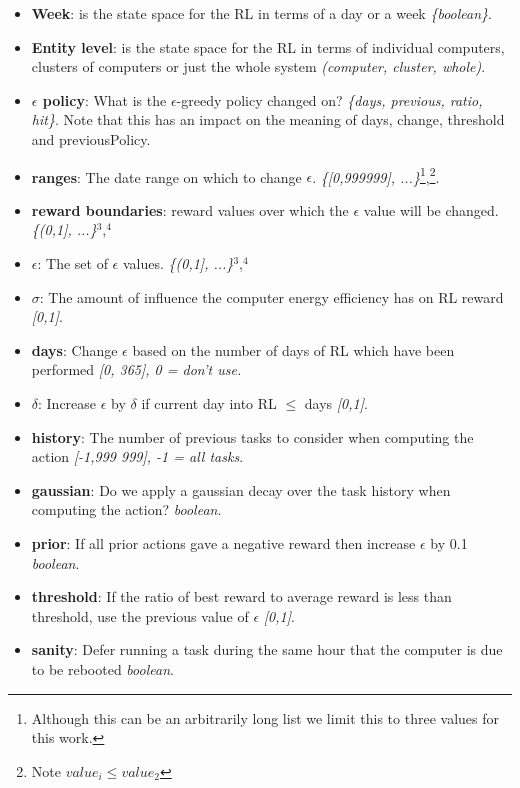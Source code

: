 \documentclass[10pt, conference, compsocconf]{IEEEtran}
\begin{document}
\begin{itemize}
	\item {\bf Week}: is the state space for the RL in terms of a day or a week {\em \{boolean\}}.
	\item {\bf Entity level}: is the state space for the RL in terms of individual computers, clusters of computers or just the whole system {\em (computer, cluster, whole)}.
	\item {\bf $\epsilon$ policy}: What is the $\epsilon$-greedy policy changed on? {\em \{days, previous, ratio, hit\}}. Note that this has an impact on the meaning of days, change, threshold and previousPolicy.
	\item {\bf ranges}: The date range on which to change $\epsilon$. {\em \{[0,999999], ...\}}\footnote{Although this can be an arbitrarily long list we limit this to three values for this work.},\footnote{Note $value_i \leq value_2$}.
	\item {\bf reward boundaries}: reward values over which the $\epsilon$ value will be changed. {\em \{(0,1], ...\}}$^3$,$^4$
	\item {\bf $\epsilon$}: The set of $\epsilon$ values. {\em \{(0,1], ...\}}$^3$,$^4$
	\item {\bf $\sigma$}: The amount of influence the computer energy efficiency has on RL reward {\em [0,1]}.
	\item {\bf days}: Change $\epsilon$ based on the number of days of RL which have been performed {\em [0, 365], 0 = don't use.}
	\item {\bf $\delta$}: Increase $\epsilon$ by $\delta$ if current day into RL	$\leq$ days {\em [0,1]}.
	\item {\bf history}: The number of previous tasks to consider when computing the action {\em [-1,999		999], -1 = all tasks}.
	\item {\bf gaussian}: Do we apply a gaussian decay over the task history when computing the action? {\em boolean}.
	\item {\bf prior}: If all prior actions gave a negative reward then increase $\epsilon$ by 0.1 {\em boolean}.
	\item {\bf threshold}: If the ratio of best reward to average reward is less than threshold, use the previous value of $\epsilon$ {\em [0,1]}.
	\item {\bf sanity}: Defer running a task during the same hour that the computer is due to be rebooted {\em boolean}.
\end{itemize}
                                                                
\end{document}
